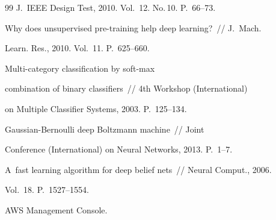 {{\begin{thebibliography}{99}
J.~IEEE Design Test, 2010. Vol.~12. No.\,10. P.~66--73.











Why does unsupervised pre-training help deep learning?~/\!\!/ J.~Mach.


Learn. Res., 2010. Vol.~11. P.~625--660.











Multi-category classification by soft-max


combination of binary classifiers~/\!\!/ 4th Workshop (International)


on Multiple Classifier Systems, 2003. P.~125--134.











Gaussian-Bernoulli deep Boltzmann machine~/\!\!/  Joint 


Conference (International) on Neural Networks, 2013. P.~1--7.











A~fast learning algorithm for deep belief nets~/\!\!/ Neural Comput., 2006. 


Vol.~18. P.~1527--1554.













AWS Management Console. 



\end{thebibliography}}}
